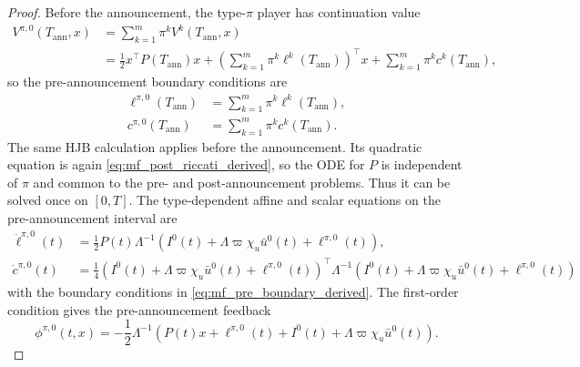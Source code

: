 \documentclass[12pt]{article}
\numberwithin{equation}{section}
\theoremstyle{definition}
\begin{document}
\begin{proof}
Before the announcement, the type-\(\pi\) player has continuation value
\[
\begin{aligned}
V^{\pi,0}(T_{\mathrm{ann}},x)
&=
\sum_{k=1}^m\pi^k V^k(T_{\mathrm{ann}},x)\\
&=
\frac12x^\top P(T_{\mathrm{ann}})x
+\left(\sum_{k=1}^m\pi^k\ell^k(T_{\mathrm{ann}})\right)^\top x
+\sum_{k=1}^m\pi^kc^k(T_{\mathrm{ann}}),
\end{aligned}
\]
so the pre-announcement boundary conditions are
\begin{subequations}\label{eq:mf_pre_boundary_derived}
\begin{align}
\ell^{\pi,0}(T_{\mathrm{ann}})
&=
\sum_{k=1}^m\pi^k\ell^k(T_{\mathrm{ann}}),
\label{eq:mf_pre_ell_boundary_derived}\\
c^{\pi,0}(T_{\mathrm{ann}})
&=
\sum_{k=1}^m\pi^kc^k(T_{\mathrm{ann}}).
\label{eq:mf_pre_alpha_boundary_derived}
\end{align}
\end{subequations}
The same HJB calculation applies before the announcement. Its quadratic
equation is again \eqref{eq:mf_post_riccati_derived}, so the ODE for \(P\) is independent of
\(\pi\) and common to the pre- and post-announcement problems. Thus it can be
solved once on \([0,T]\). The type-dependent affine and scalar equations on the
pre-announcement interval are
\begin{subequations}\label{eq:mf_pre_value_system_derived}
\begin{align}
\dot\ell^{\pi,0}(t)
&=
\frac12P(t)\Lambda^{-1}
\left(I^0(t)+\Lambda\varpi\chi_u\bar u^0(t)+\ell^{\pi,0}(t)\right),
\label{eq:mf_pre_ell_derived}\\
\dot c^{\pi,0}(t)
&=
\frac14
\left(I^0(t)+\Lambda\varpi\chi_u\bar u^0(t)+\ell^{\pi,0}(t)\right)^\top
\Lambda^{-1}
\left(I^0(t)+\Lambda\varpi\chi_u\bar u^0(t)+\ell^{\pi,0}(t)\right)
\label{eq:mf_pre_alpha_derived}
\end{align}
\end{subequations}
with the boundary conditions in \eqref{eq:mf_pre_boundary_derived}. The
first-order condition gives the pre-announcement feedback
\begin{equation}\label{eq:mf_pre_feedback_derived}
\phi^{\pi,0}(t,x)
=
-\frac12\Lambda^{-1}
\left(P(t)x+\ell^{\pi,0}(t)+I^0(t)+\Lambda\varpi\chi_u\bar u^0(t)\right).
\end{equation}


\end{proof}
\end{document}
